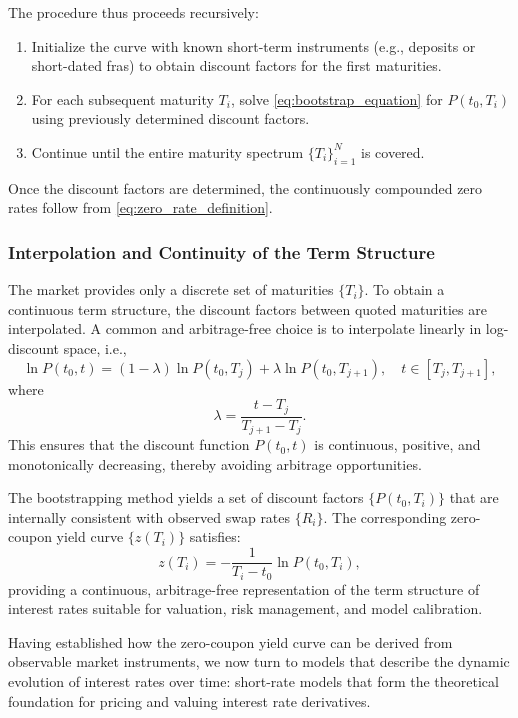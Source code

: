 The procedure thus proceeds recursively:
\begin{enumerate}
	\item Initialize the curve with known short-term instruments (e.g., deposits or short-dated \ac{fra}s) to obtain discount factors for the first maturities.
	\item For each subsequent maturity $T_i$, solve \eqref{eq:bootstrap_equation} for $P(t_0, T_i)$ using previously determined discount factors.
	\item Continue until the entire maturity spectrum $\{T_i\}_{i=1}^N$ is covered.
\end{enumerate}

Once the discount factors are determined, the continuously compounded zero rates follow from \eqref{eq:zero_rate_definition}.

\subsubsection{Interpolation and Continuity of the Term Structure}
The market provides only a discrete set of maturities $\{T_i\}$. To obtain a continuous term structure, the discount factors between quoted maturities are interpolated. A common and arbitrage-free choice is to interpolate linearly in log-discount space, i.e.,
\begin{equation}
	\ln P(t_0, t) = (1 - \lambda) \ln P(t_0, T_j) + \lambda \ln P(t_0, T_{j+1}),
	\quad t \in [T_j, T_{j+1}],
	\label{eq:log_linear_interpolation}
\end{equation}
where
\begin{equation}
	\lambda = \frac{t - T_j}{T_{j+1} - T_j}.
\end{equation}
This ensures that the discount function $P(t_0, t)$ is continuous, positive, and monotonically decreasing, thereby avoiding arbitrage opportunities.

The bootstrapping method yields a set of discount factors $\{P(t_0, T_i)\}$ that are internally consistent with observed swap rates $\{R_i\}$. The corresponding zero-coupon yield curve $\{z(T_i)\}$ satisfies:
\begin{equation}
	z(T_i) = -\frac{1}{T_i - t_0} \ln P(t_0, T_i),
\end{equation}
providing a continuous, arbitrage-free representation of the term structure of interest rates suitable for valuation, risk management, and model calibration.

Having established how the zero-coupon yield curve can be derived from observable market instruments, we now turn to models that describe the dynamic evolution of interest rates over time: short-rate models that form the theoretical foundation for pricing and valuing interest rate derivatives.

